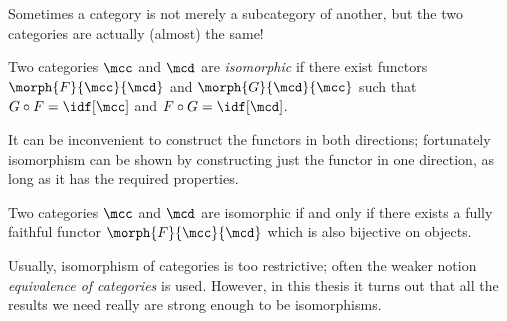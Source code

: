 Sometimes a category is not merely a subcategory of another, but the two
categories are actually (almost) the same!

\begin{definition}
    Two categories \(\mcc\) and \(\mcd\) are \emph{isomorphic} if there exist
    functors \(\morph{F}{\mcc}{\mcd}\) and \(\morph{G}{\mcd}{\mcc}\) such that
    \(G \circ F = \idf[\mcc]\) and \(F \circ G = \idf[\mcd]\).
\end{definition}

It can be inconvenient to construct the functors in both directions; fortunately
isomorphism can be shown by constructing just the functor in one direction, as
long as it has the required properties.

\begin{lemma}
    Two categories \(\mcc\) and \(\mcd\) are isomorphic if and only if there
    exists a fully faithful functor \(\morph{F}{\mcc}{\mcd}\) which is also
    bijective on objects.
\end{lemma}

\begin{remark}
    Usually, isomorphism of categories is too restrictive; often the weaker
    notion \emph{equivalence of categories} is used.
    However, in this thesis it turns out that all the results we need really are
    strong enough to be isomorphisms.
\end{remark}